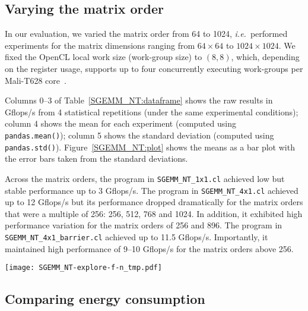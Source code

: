 \documentclass{acm_proc_article-sp} %
\begin{document}
\subsection{Varying the matrix order}


In our evaluation, we varied the matrix order from 64 to 1024,
{\em i.e.}\ performed experiments for the matrix dimensions ranging from $64
\times 64$ to $1024 \times 1024$.
%
We fixed the OpenCL local work size (work-group size) to $(8,8)$, which,
depending on the register usage, supports up to four concurrently executing
work-groups per Mali-T628 core~\cite{Gronqvist:2014}.

Columns 0--3 of Table~\ref{SGEMM_NT:dataframe} shows the raw results in
Gflops/s from 4 statistical repetitions (under the same experimental
conditions); column 4 shows the mean for each experiment (computed using {\tt
pandas.mean()}); column 5 shows the standard deviation (computed using {\tt
pandas.std()}).
%
Figure~\ref{SGEMM_NT:plot} shows the means as a bar plot with the error bars
taken from the standard deviations.

Across the matrix orders, the program in \verb|SGEMM_NT_1x1.cl| achieved
low but stable performance up to 3 Gflops/s.
%
The program in \verb|SGEMM_NT_4x1.cl| achieved up to 12 Gflops/s but its
performance dropped dramatically for the matrix orders that were a multiple of
256: 256, 512, 768 and 1024.
%
In addition, it exhibited high performance variation for the matrix orders of
256 and 896.
%
The program in \verb|SGEMM_NT_4x1_barrier.cl| achieved up to 11.5
Gflops/s. Importantly, it maintained high performance of 9--10 Gflops/s
for the matrix orders above 256.


\begin{table*}
\centering
\caption{\label{SGEMM_NT:dataframe}The performance of 3 SGEMM NT kernels: {\tt pandas} DataFrame with raw results.}

\end{table*}

\begin{figure*}
\texttt{[image: SGEMM\_NT-explore-f-n\_tmp.pdf]}
\caption{The performance of 3 SGEMM NT kernels: {\tt matplotlib} bar plot with error bars.}
\label{SGEMM_NT:plot}
\end{figure*}

\subsection{Comparing energy consumption}
\end{document}
